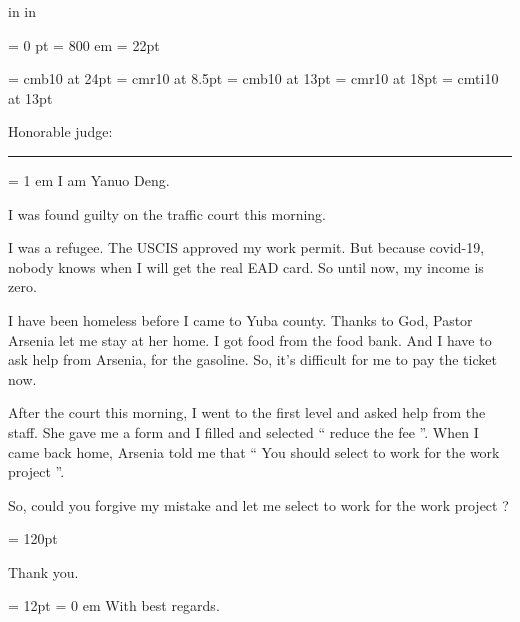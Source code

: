  in  %
 in  %


\nopagenumbers

\parindent = 0 pt
\emergencystretch = 800 em
\baselineskip = 22pt


\font\FFaa=      cmb10            at 24pt
\font\FFbb=      cmr10            at 8.5pt
\font\FFcc=      cmb10            at 13pt
\font\FFdd=      cmr10            at 18pt
\font\FFee=      cmti10           at 13pt


\bigbreak


{ \medbreak } { \FFaa
Honorable judge:

}

{ \smallbreak } {\par\noindent\hrule} { \smallbreak }

\FFdd
\parindent = 1 em
I am Yanuo Deng. 

I was found guilty on the traffic court this morning. 

I was a refugee. The USCIS approved my work permit. But because covid-19, nobody knows when I will get the real EAD card. So until now, my income is zero. 

I have been homeless before I came to Yuba county. Thanks to God, Pastor Arsenia let me stay at her home. I got food from the food bank. And I have to ask help from Arsenia, for the gasoline. So, it's difficult for me to pay the ticket now.

After the court this morning, I went to the first level and asked help from the staff. 
She gave me a form and I filled and selected `` reduce the fee ''. 
When I came back home, Arsenia told me that `` You should select to work for the work project ''.

So, could you forgive my mistake and let me select to work for the work project ?

\baselineskip = 120pt

Thank you.

\baselineskip = 12pt
\parindent = 0 em
With best regards.

\bye
